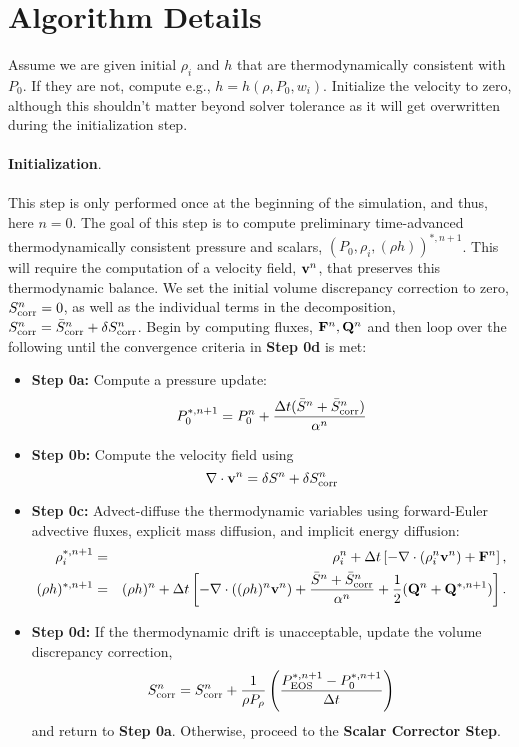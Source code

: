 \documentclass[final]{siamltex}
\def\Fb {{\bf F}}
\def\Qb {{\bf Q}}
\def\vb {{\bf v}}
\begin{document}
\section{Algorithm Details}
Assume we are given initial $\rho_i$ and $h$ that are thermodynamically consistent with 
$P_0$.  If they are not, compute e.g., $h = h(\rho,P_0,w_i)$.  Initialize the velocity
to zero, although this shouldn't matter beyond solver tolerance as it will get 
overwritten during the initialization step.\\ \\
{\bf Initialization}.\\ \\
This step is only performed once at the beginning of the simulation, and
thus, here $n=0$.
The goal of this step is to compute preliminary time-advanced thermodynamically
consistent pressure and scalars, $(P_0,\rho_i,(\rho h))^{*,n+1}$.  This will
require the computation of a velocity field, $\vb^n$, that preserves this
thermodynamic balance.  
We set the initial volume discrepancy correction to zero, 
$S_{\rm corr}^n = 0$, as well as the individual terms in the decomposition,
$S_{\rm corr}^n = \bar{S}_{\rm corr}^n + \delta S_{\rm corr}^n$.
Begin by computing fluxes, $\Fb^n, \Qb^n$ and then
loop over the following until the convergence criteria in {\bf Step 0d} is met:\\
\begin{itemize}
\item {\bf Step 0a:} Compute a pressure update:
\begin{equation}
P_0^{*,n+1} = P_0^n + \frac{\Delta t(\bar{S}^n + \bar{S}_{\rm corr}^n)}{\alpha^n}
\end{equation}
\item {\bf Step 0b:} Compute the velocity field using
\begin{equation}
\nabla\cdot\vb^n = \delta S^n + \delta S_{\rm corr}^n
\end{equation}
\item {\bf Step 0c:} Advect-diffuse the thermodynamic variables using forward-Euler advective fluxes,
explicit mass diffusion, and implicit energy diffusion:
\begin{eqnarray}
\rho_i^{*,n+1} &=& \rho_i^n + \Delta t\left[-\nabla\cdot(\rho_i^n\vb^n) + \Fb^n\right], \\
(\rho h)^{*,n+1} &=& (\rho h)^n + \Delta t\left[-\nabla\cdot((\rho h)^n\vb^n) + \frac{\bar{S}^n + \bar{S}_{\rm corr}^n}{\alpha^n} + \frac{1}{2}(\Qb^n + \Qb^{*,n+1})\right].\nonumber\\
\end{eqnarray}
\item {\bf Step 0d:} If the thermodynamic drift is unacceptable, update the volume 
discrepancy correction,
\begin{equation}
S_{\rm corr}^n = S_{\rm corr}^n + \frac{1}{\rho P_\rho}\left(\frac{P_{\rm EOS}^{*,n+1} - P_0^{*,n+1}}{\Delta t}\right)
\end{equation}
and return to {\bf Step 0a}.  Otherwise, proceed to the {\bf Scalar Corrector Step}.\\
\end{itemize}
\end{document}

